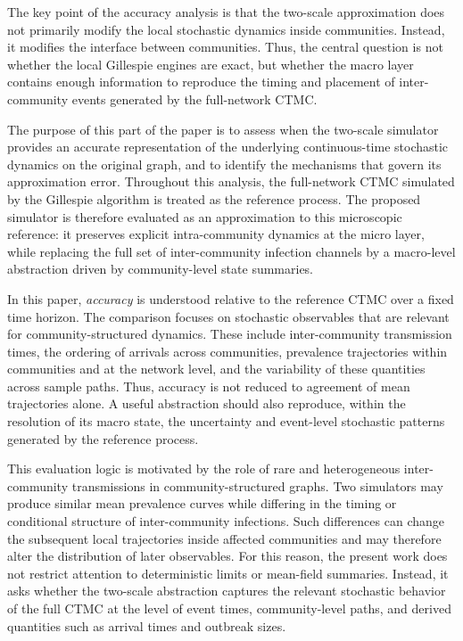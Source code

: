 \documentclass[a4paper,fleqn]{cas-sc}
\begin{document}
The key point of the accuracy analysis is that the two-scale approximation does not primarily modify the local stochastic dynamics inside communities. 
Instead, it modifies the interface between communities. 
Thus, the central question is not whether the local Gillespie engines are exact, but whether the macro layer contains enough information to reproduce the timing and placement of inter-community events generated by the full-network CTMC.

The purpose of this part of the paper is to assess when the two-scale simulator provides an accurate representation of the underlying continuous-time stochastic dynamics on the original graph, and to identify the mechanisms that govern its approximation error. Throughout this analysis, the full-network CTMC simulated by the Gillespie algorithm is treated as the reference process. The proposed simulator is therefore evaluated as an approximation to this microscopic reference: it preserves explicit intra-community dynamics at the micro layer, while replacing the full set of inter-community infection channels by a macro-level abstraction driven by community-level state summaries.

In this paper, \emph{accuracy} is understood relative to the reference CTMC over a fixed time horizon. The comparison focuses on stochastic observables that are relevant for community-structured dynamics. These include inter-community transmission times, the ordering of arrivals across communities, prevalence trajectories within communities and at the network level, and the variability of these quantities across sample paths. Thus, accuracy is not reduced to agreement of mean trajectories alone. A useful abstraction should also reproduce, within the resolution of its macro state, the uncertainty and event-level stochastic patterns generated by the reference process.

This evaluation logic is motivated by the role of rare and heterogeneous inter-community transmissions in community-structured graphs. Two simulators may produce similar mean prevalence curves while differing in the timing or conditional structure of inter-community infections. Such differences can change the subsequent local trajectories inside affected communities and may therefore alter the distribution of later observables. For this reason, the present work does not restrict attention to deterministic limits or mean-field summaries. Instead, it asks whether the two-scale abstraction captures the relevant stochastic behavior of the full CTMC at the level of event times, community-level paths, and derived quantities such as arrival times and outbreak sizes.
\end{document}
